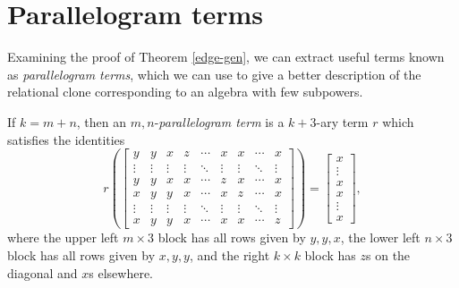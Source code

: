 \documentclass[letterpaper,11pt]{article}
\begin{document}
\section{Parallelogram terms}

Examining the proof of Theorem \ref{edge-gen}, we can extract useful terms known as \emph{parallelogram terms}, which we can use to give a better description of the relational clone corresponding to an algebra with few subpowers.

\begin{defn} If $k = m+n$, then an $m,n$-\emph{parallelogram term} is a $k+3$-ary term $r$ which satisfies the identities
\[
r\left(\begin{bmatrix} y & y & x & z & \cdots & x & x & \cdots & x\\ \vdots & \vdots & \vdots & \vdots & \ddots & \vdots & \vdots & \ddots & \vdots\\ y & y & x & x & \cdots & z & x & \cdots & x\\ x & y & y & x & \cdots & x & z & \cdots & x\\ \vdots & \vdots & \vdots & \vdots & \ddots & \vdots & \vdots & \ddots & \vdots\\ x & y & y & x & \cdots & x & x & \cdots & z \end{bmatrix}\right) = \begin{bmatrix} x\\ \vdots\\ x\\ x\\ \vdots\\ x \end{bmatrix},
\]
where the upper left $m\times 3$ block has all rows given by $y, y, x$, the lower left $n \times 3$ block has all rows given by $x,y,y$, and the right $k\times k$ block has $z$s on the diagonal and $x$s elsewhere.
\end{defn}
\end{document}
